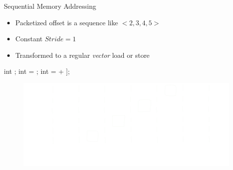 \begin{frame}[fragile]{Sequential Memory Addressing}

\begin{itemize}
    \item Packetized offset is a sequence like $<2, 3, 4, 5>$
    \item Constant $Stride = 1$
    \item Transformed to a regular \emph{vector} load or store
\end{itemize}

\begin{minipage}[t]{0.40\linewidth}
    \vspace{0.1ex}
    \begin{codebox}[commandchars=\\\[\]]

int \uniform[*src];
int \varying[tid] = ;
int \varying[x] = \uniform[src]\idx[\varying[tid] + \uniform[2]];





    \end{codebox}
\end{minipage}
\hspace{2em}
\begin{minipage}[t]{0.49\linewidth}
    \vspace{0.6ex}
    \begin{figure}
        \includegraphics[width=1.0\textwidth]{images/sequential-access.pdf}
    \end{figure}
\end{minipage}

\end{frame}


